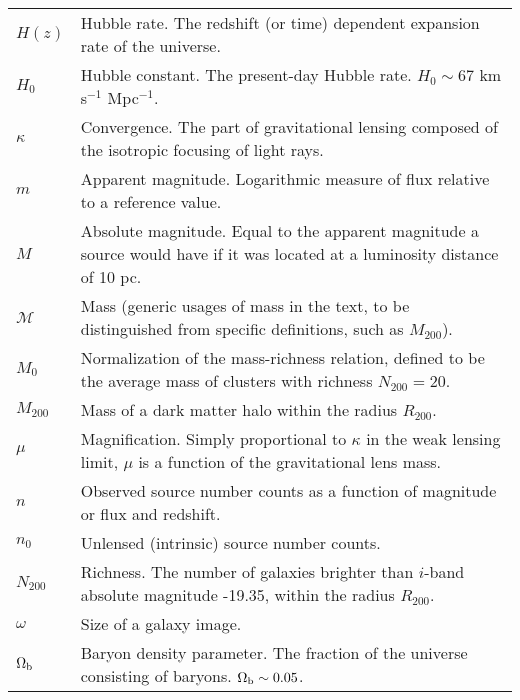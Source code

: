 \begin{tabular}{p{0.6in}p{5.8in}}
$H(z)$ & Hubble rate. The redshift (or time) dependent expansion rate of the universe. \\
$H_0$ & Hubble constant. The present-day Hubble rate. $H_0 \sim 67$ km s$^{-1}$ Mpc$^{-1}$. \\
$\kappa$ & Convergence. The part of gravitational lensing composed of the isotropic focusing of light rays. \\
$m$ & Apparent magnitude. Logarithmic measure of flux relative to a reference value. \\
$M$ & Absolute magnitude. Equal to the apparent magnitude a source would have if it was located at a luminosity distance of 10 pc. \\
${\mathscr M}$ & Mass (generic usages of mass in the text, to be distinguished from specific definitions, such as $M_{200}$). \\
$M_0$ & Normalization of the mass-richness relation, defined to be the average mass of clusters with richness $N_{200} = 20$. \\
$M_{200}$ & Mass of a dark matter halo within the radius $R_{200}$. \\
$\mu$ & Magnification. Simply proportional to $\kappa$ in the weak lensing limit, $\mu$ is a function of the gravitational lens mass. \\
$n$ & Observed source number counts as a function of magnitude or flux and redshift. \\
$n_0$ & Unlensed (intrinsic) source number counts. \\
$N_{200}$ & Richness. The number of galaxies brighter than $i$-band absolute magnitude -19.35, within the radius $R_{200}$. \\
$\omega$ & Size of a galaxy image. \\
$\Omega_{\rm b}$ & Baryon density parameter. The fraction of the universe consisting of baryons. $\Omega_{\rm b} \sim 0.05$. \\

\end{tabular}
